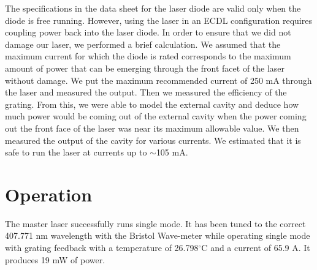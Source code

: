 The specifications in the data sheet for the laser diode are valid only when the diode is free running. However, using the laser in an ECDL configuration requires coupling power back into the laser diode. In order to ensure that we did not damage our laser, we performed a brief calculation. We assumed that the maximum current for which the diode is rated corresponds to the maximum amount of power that can be emerging through the front facet of the laser without damage. We put the maximum recommended current of 250 mA through the laser and measured the output. Then we measured the efficiency of the grating. From this, we were able to model the external cavity and deduce how much power would be coming out of the external cavity when the power coming out the front face of the laser was near its maximum allowable value. We then measured the output of the cavity for various currents. We estimated that it is safe to run the laser at currents up to $\sim$105 mA. 

 
\section{Operation}

The master laser successfully runs single mode. It has been tuned to the correct 407.771 nm wavelength with the Bristol Wave-meter while operating single mode with grating feedback with a temperature of 26.798$^\circ$C and a current of 65.9 A. It produces 19 mW of power. 




